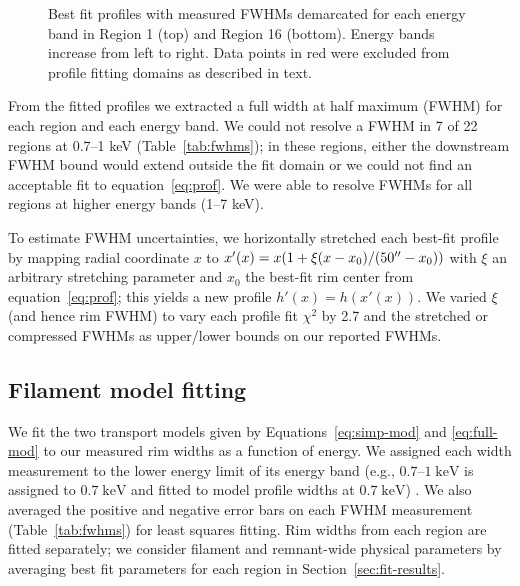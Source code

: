 \documentclass[iop, apj, numberedappendix, twocolappendix]{emulateapj}
\newcommand*{\mt}{\mathrm}
\newcommand*{\unit}[1]{\;\mt{#1}}  %
\begin{document}
\begin{figure*}[ht]
    \caption{Best fit profiles with measured FWHMs demarcated for each energy
        band in Region 1 (top) and Region 16 (bottom).  Energy bands increase
        from left to right.  Data points in red were excluded from profile
        fitting domains as described in text.}
    \label{fig:profiles}
\end{figure*}

From the fitted profiles we extracted a full width at half maximum (FWHM) for
each region and each energy band.  We could not resolve a FWHM in 7 of 22
regions at 0.7--1 keV (Table~\ref{tab:fwhms}); in these regions, either
the downstream FWHM bound would extend outside the fit domain or we could not
find an acceptable fit to equation~\eqref{eq:prof}.  We were able to resolve
FWHMs for all regions at higher energy bands (1--7 keV).

To estimate FWHM uncertainties, we horizontally stretched each best-fit
profile by mapping radial coordinate $x$ to
$x'(x) = x (1 + \xi (x-x_0)/(50\mbox{$^{\prime\prime}$}-x_0))$ with $\xi$ an arbitrary stretching
parameter and $x_0$ the best-fit rim center from equation~\eqref{eq:prof};
this yields a new profile $h'(x) = h(x'(x))$.
We varied $\xi$ (and hence rim FWHM) to vary each profile fit $\chi^2$ by 2.7
and the stretched or compressed FWHMs as upper/lower bounds on our reported
FWHMs. 


\subsection{Filament model fitting}
\label{sec:fits}

We fit the two transport models given by Equations~\eqref{eq:simp-mod} and
\eqref{eq:full-mod} to our measured rim widths as a function of energy.
We assigned each width measurement to the lower energy limit of its energy band
(e.g., $0.7$--$1 \unit{keV}$ is assigned to $0.7 \unit{keV}$ and fitted to
model profile widths at $0.7 \unit{keV}$) .
We also averaged the positive and negative error bars on each FWHM measurement
(Table~\ref{tab:fwhms}) for least squares fitting.
Rim widths from each region are fitted separately; we consider filament and
remnant-wide physical parameters by averaging best fit parameters for each
region in Section~\ref{sec:fit-results}.
\end{document}
